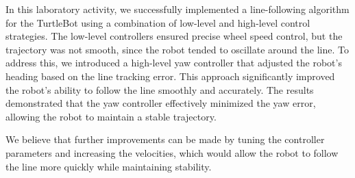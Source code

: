 In this laboratory activity, we successfully implemented a line-following algorithm for the TurtleBot using a combination of low-level and high-level control strategies. 
The low-level controllers ensured precise wheel speed control, but the trajectory was not smooth, since the robot tended to oscillate around the line. 
To address this, we introduced a high-level yaw controller that adjusted the robot's heading based on the line tracking error. 
This approach significantly improved the robot's ability to follow the line smoothly and accurately. 
The results demonstrated that the yaw controller effectively minimized the yaw error, allowing the robot to maintain a stable trajectory.

We believe that further improvements can be made by tuning the controller parameters and increasing the velocities, which would allow the robot to follow the line more quickly while maintaining stability.